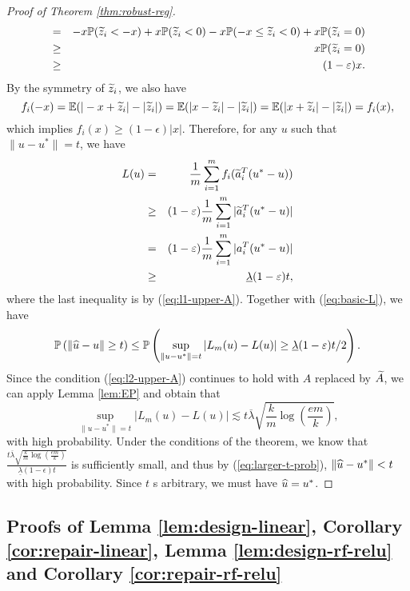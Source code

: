 \begin{proof}[Proof of Theorem \ref{thm:robust-reg}]
\begin{eqnarray*}
&=& -x\mathbb{P}(\wt{z}_i<-x) + x\mathbb{P}(\wt{z}_i< 0) - x\mathbb{P}(-x\leq \wt{z}_i< 0)  + x\mathbb{P}(\wt{z}_i=0) \\
&\geq& x\mathbb{P}(\wt{z}_i=0) \\
&\geq& (1-\epsilon)x.
\end{eqnarray*}
By the symmetry of $\widetilde{z}_i$, we also have
$$f_i(-x)=\mathbb{E}(|-x+\widetilde{z}_i|-|\widetilde{z}_i|)=\mathbb{E}(|x-\widetilde{z}_i|-|\widetilde{z}_i|)=\mathbb{E}(|x+\widetilde{z}_i|-|\widetilde{z}_i|)=f_i(x),$$
which implies $f_i(x)\geq (1-\epsilon)|x|$. Therefore, for any $u$ such that $\|u-u^*\|=t$, we have
\begin{eqnarray*}
L(u) &=& \frac{1}{m}\sum_{i=1}^mf_i(\wt{a}_i^T(u^*-u)) \\
&\geq& (1-\epsilon)\frac{1}{m}\sum_{i=1}^m|\wt{a}_i^T(u^*-u)| \\
&=& (1-\epsilon)\frac{1}{m}\sum_{i=1}^m|a_i^T(u^*-u)| \\
&\geq& \underline{\lambda}(1-\epsilon)t,
\end{eqnarray*}
where the last inequality is by (\ref{eq:l1-upper-A}). Together with (\ref{eq:basic-L}), we have
\begin{equation}
\mathbb{P}\left(\|\wh{u}-u\|\geq t\right) \leq \mathbb{P}\left(\sup_{\|u-u^*\|= t}|L_m(u)-L(u)| \geq \underline{\lambda}(1-\epsilon)t/2\right). \label{eq:larger-t-prob}
\end{equation}
Since the condition (\ref{eq:l2-upper-A}) continues to hold with $A$ replaced by $\widetilde{A}$, we can apply Lemma \ref{lem:EP} and obtain that
$$\sup_{\|u-u^*\|= t}|L_m(u)-L(u)| \lesssim t\overline{\lambda}\sqrt{\frac{k}{m}\log\left(\frac{em}{k}\right)},$$
with high probability. Under the conditions of the theorem, we know that $\frac{t\overline{\lambda}\sqrt{\frac{k}{m}\log\left(\frac{em}{k}\right)}}{\underline{\lambda}(1-\epsilon)t}$ is sufficiently small, and thus by (\ref{eq:larger-t-prob}), $\|\widehat{u}-u^*\|<t$ with high probability. Since $t$ s arbitrary, we must have $\widehat{u}=u^*$.
\end{proof}


\subsection{Proofs of Lemma \ref{lem:design-linear}, Corollary \ref{cor:repair-linear}, Lemma \ref{lem:design-rf-relu} and Corollary \ref{cor:repair-rf-relu}}


